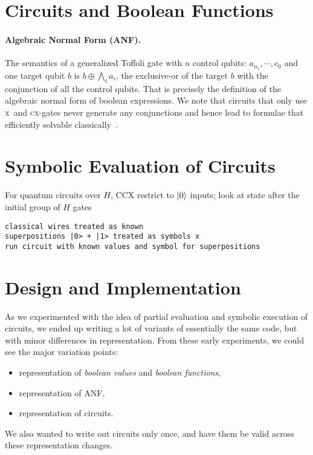 \documentclass[sigplan]{acmart}
\newcommand{\x}{\textsc{x}}
\newcommand{\cx}{\textsc{cx}}
\begin{document}
\section{Circuits and Boolean Functions}
 
\paragraph*{Algebraic Normal Form (ANF).}
The semantics of a generalized Toffoli gate with $n$ control qubits:
$a_{n_1},\cdots,c_0$ and one target qubit $b$ is $b \oplus \bigwedge_i
a_i$, the exclusive-or of the target $b$ with the conjunction of all
the control qubits. That is precisely the definition of the algebraic
normal form of boolean expressions. We note that circuits that only
use \x\ and \cx-gates never generate any conjunctions and hence lead
to formulae that efficiently solvable
classically~\cite{10.5555/35517,TOKAREVA20151}.

\section{Symbolic Evaluation of Circuits}

For quantum circuits over $H$, CCX
restrict to $\ket{0}$ inputs; look at state after the initial group of
$H$ gates
\begin{verbatim}
classical wires treated as known
superpositions |0> + |1> treated as symbols x
run circuit with known values and symbol for superpositions
\end{verbatim}

\section{Design and Implementation}

As we experimented with the idea of partial evaluation and symbolic
execution of circuits, we ended up writing a lot of variants of
essentially the same code, but with minor differences in representation.
From these early experiments, we could see the major variation points:
\begin{itemize}
  \item representation of \emph{boolean values} and \emph{boolean functions},
  \item representation of ANF,
  \item representation of circuits.
\end{itemize}
We also wanted to write out circuits only once, and have them be valid
across these representation changes.
\end{document}
